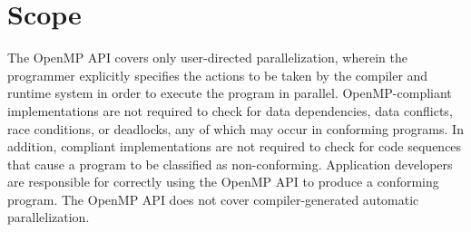 \section{Scope}
\label{sec:Scope}
The OpenMP API covers only user-directed parallelization, wherein the 
programmer explicitly specifies the actions to be taken by the compiler 
and runtime system in order to execute the program in parallel. 
OpenMP-compliant implementations are not required to check for data 
dependencies, data conflicts, race conditions, or deadlocks, any of
which may occur in conforming programs. In addition, compliant 
implementations are not required to check for code sequences that 
cause a program to be classified as non-conforming. Application 
developers are responsible for correctly using the OpenMP API
to produce a conforming program. The OpenMP API does not cover 
compiler-generated automatic parallelization.

